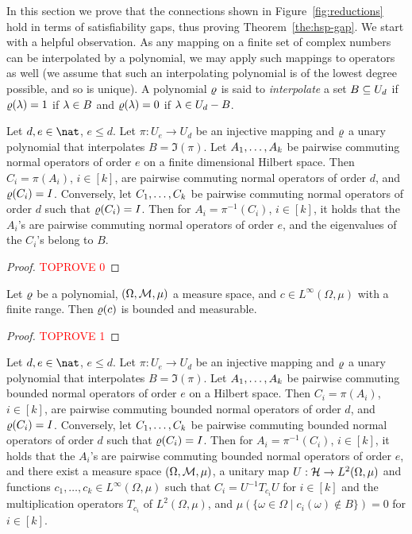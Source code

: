 In this section we prove that the connections shown in
Figure~\ref{fig:reductions} hold in terms of satisfiability gaps, thus proving
Theorem~\ref{the:hsp-gap}. We start with a helpful observation. As any mapping on a finite set of complex numbers can be interpolated by a polynomial, we may apply such mappings to operators as well (we assume that such an interpolating polynomial is of the lowest degree possible, and so is unique). A polynomial $\varrho$ is said to \emph{interpolate} a set $B\subseteq U_d$ if $\varrho(\lambda)=1$ if $\lambda\in B$ and $\varrho(\lambda)=0$ if $\lambda\in U_d-B$.

\begin{lemma}\label{lem:mapping}
Let $d,e\in\nat$, $e\le d$. 
Let $\pi:U_e\to U_d$ be an injective mapping and $\varrho$ a unary polynomial that interpolates $B=\Im(\pi)$.  Let $A _1,\ldots, A _{k}$ be pairwise commuting normal operators of order $e$ on a finite dimensional Hilbert space. Then $C_i=\pi(A_i)$, $i\in[k]$, are pairwise commuting normal operators of order $d$, and $\varrho(C_i)=I$. Conversely, let $C _1,\ldots, C _{k}$ be pairwise commuting normal operators of order $d$ such that $\varrho(C_i)=I$. Then for $A_i=\pi^{-1}(C_i)$, $i\in[k]$, it holds that the $A_i$'s are pairwise commuting normal operators of order $e$, and the eigenvalues of the $C_i$'s belong to $B$.
\end{lemma}

\begin{proof}\textcolor{red}{TOPROVE 0}\end{proof}

\begin{lemma}\label{lem:polynomial-image}
Let $\varrho$ be a polynomial, $(\Omega,{\mathcal M},\mu)$ a measure space, and $c\in L^\infty(\Omega,\mu)$ with a finite range. Then $\varrho(c)$ is bounded and measurable.
\end{lemma}

\begin{proof}\textcolor{red}{TOPROVE 1}\end{proof}

\begin{lemma}\label{lem:mapping-infinite}
Let $d,e\in\nat$, $e\le d$. 
Let $\pi:U_e\to U_d$ be an injective mapping and $\varrho$ a unary polynomial that interpolates $B=\Im(\pi)$.  Let $A _1,\ldots, A _{k}$ be pairwise commuting bounded normal operators of order $e$ on a Hilbert space. Then $C_i=\pi(A_i)$, $i\in[k]$, are pairwise commuting bounded normal operators of order $d$, and $\varrho(C_i)=I$. Conversely, let $C _1,\ldots, C _{k}$ be pairwise commuting bounded normal operators of order $d$ such that $\varrho(C_i)=I$. Then for $A_i=\pi^{-1}(C_i)$, $i\in[k]$, it holds that the $A_i$'s are pairwise commuting bounded normal operators of order $e$, and there exist a measure space $(\Omega,{\mathcal M},\mu)$, a unitary map $U:{\mathcal H}\to L^2(\Omega,\mu)$ and functions $c_1,\dots,c_k\in L^\infty(\Omega,\mu)$ such that $C_i = U^{-1} T_{c_i}U$ for $i\in [k]$ and the multiplication operators $T_{c_i}$ of $L^2(\Omega,\mu)$, and $\mu(\{\omega\in\Omega\mid c_i(\omega)\not\in B\}) = 0$ for $i\in[k]$.
\end{lemma}


